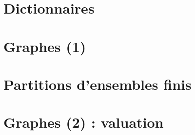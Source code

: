 \documentclass{minitelreport}
\begin{document}
\begin{refsection}
		\section{Dictionnaires}
			\label{sec:dictionnaires}
			
		\newpage
		\section{Graphes (1)}
			\label{sec:graphes}
			
		\newpage
		\section{Partitions d'ensembles finis}
			\label{sec:partitions}
			
		\newpage
		\section{Graphes (2) : valuation}
			\label{sec:graphes_values}
			
		\newpage

\end{refsection}
\end{document}
